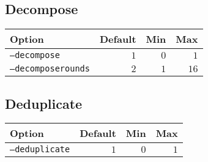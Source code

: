 \documentclass{article}
\begin{document}
\subsection{Decompose}
\begin{tabular}{l|rrr}
    Option & Default & Min & Max \\
    \hline
    \texttt{--decompose}       & $1$  & $0$  & $1$ \\
    \texttt{--decomposerounds} & $2$  & $1$  & $16$ \\    
\end{tabular}

\subsection{Deduplicate}
\begin{tabular}{l|rrr}
    Option & Default & Min & Max \\
    \hline
    \texttt{--deduplicate} & $1$  & $0$  & $1$ \\
\end{tabular}
\end{document}
